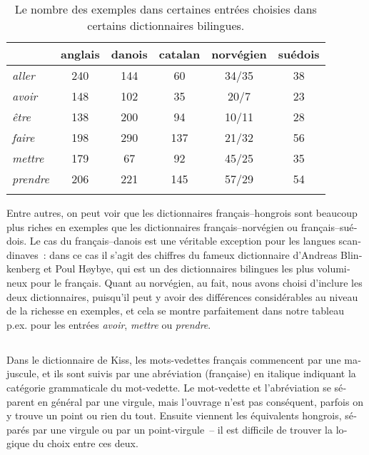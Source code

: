 \documentclass[output=paper,colorlinks,citecolor=brown,arabicfont,chinesefont,booklanguage=french]{langscibook}
\begin{document}
\begin{otherlanguage}{french}
\begin{table}[p]
\caption{Le nombre des exemples dans certaines entrées choisies dans certains dictionnaires bilingues.}
\label{til:tab4}
\begin{tabular}{>{\itshape}lccccc}
\lsptoprule
& anglais & danois & catalan & norvégien & suédois\\
\midrule
aller   & 240 & 144 & 60  & 34/35 & 38 \\
avoir   & 148 & 102 & 35  & 20/7  & 23 \\
être    & 138 & 200 & 94  & 10/11 & 28 \\
faire   & 198 & 290 & 137 & 21/32 & 56 \\
mettre  & 179 & 67  & 92  & 45/25 & 35 \\
prendre & 206 & 221 & 145 & 57/29 & 54 \\
\lspbottomrule
\end{tabular}
\end{table}

Entre autres, on peut voir que les dictionnaires français–hongrois sont beaucoup plus riches en exemples que les dictionnaires français–norvégien ou français–suédois. Le cas du français–danois est une véritable exception pour les langues scandinaves~: dans ce cas il s’agit des chiffres du fameux dictionnaire d’Andreas Blinkenberg et Poul Høybye, qui est un des dictionnaires bilingues les plus volumineux pour le français. Quant au norvégien, au fait, nous avons choisi d’inclure les deux dictionnaires, puisqu’il peut y avoir des différences considérables au niveau de la richesse en exemples, et cela se montre parfaitement dans notre tableau p.ex. pour les entrées \emph{avoir}, \emph{mettre} ou \emph{prendre}.



\subsection{\citealt{Kiss1844}}\label{sec:tillinger:3.1}

Dans le dictionnaire de Kiss, les mots-vedettes français commencent par une majuscule, et ils sont suivis par une abréviation (française) en italique indiquant la catégorie grammaticale du mot-vedette. Le mot-vedette et l’abréviation se séparent en général par une virgule, mais l’ouvrage n’est pas conséquent, parfois on y trouve un point ou rien du tout. Ensuite viennent les équivalents hongrois, séparés par une virgule ou par un point-virgule~-- il est difficile de trouver la logique du choix entre ces deux. 


\end{otherlanguage}
\end{document}
